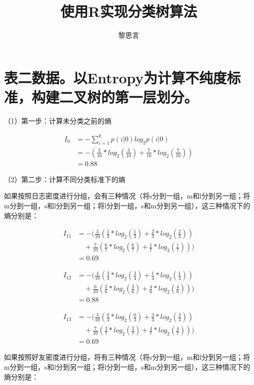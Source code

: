 \documentclass[11pt,a4paper,onecolumn]{article}
\begin{document}
\title{\bfseries 使用R实现分类树算法}
\date{}
\author{黎思言}
\maketitle

\section{表二数据。以Entropy为计算不纯度标准，构建二叉树的第一层划分。}

（1）第一步：计算未分类之前的熵

\begin{align*}
	I_0 &=-\sum_{i=1}^kp(i|0)log_2p(i|0) \\
      &=-(\frac{3}{10}*log_2(\frac{3}{10})+\frac{7}{10}*log_2(\frac{7}{10})) \\
			&=0.88
\end{align*}

（2）第二步：计算不同分类标准下的熵

如果按照日志密度进行分组，会有三种情况（将s分到一组，m和l分到另一组；将m分到一组，s和l分到另一组；将l分到一组，s和m分到另一组），这三种情况下的熵分别是：

\begin{align*}
	I_{11} &=-(\frac{3}{10}(\frac{1}{3}*log_2(\frac{1}{3})+\frac{2}{3}*log_2(\frac{2}{3})) \\
			&\quad+ \frac{7}{10}(\frac{6}{7}*log_2(\frac{6}{7})+\frac{1}{7}*log_2(\frac{1}{7}))) \\
			&=0.69
\end{align*}

\begin{align*}
	I_{12} &=-(\frac{4}{10}(\frac{3}{4}*log_2(\frac{3}{4})+\frac{1}{4}*log_2(\frac{1}{4}) )\\
			&\quad+ \frac{6}{10}(\frac{2}{6}*log_2(\frac{2}{6})+\frac{4}{6}*log_2(\frac{4}{6}))) \\
			&=0.88
\end{align*}

\begin{align*}
	I_{13} &=-(\frac{3}{10}(\frac{0}{3}*log_2(\frac{0}{3})+\frac{3}{3}*log_2(\frac{3}{3})) \\
			&\quad+ \frac{7}{10}(\frac{3}{7}*log_2(\frac{3}{7})+\frac{4}{7}*log_2(\frac{4}{7}))) \\
			&=0.69
\end{align*}

如果按照好友密度进行分组，将有三种情况（将s分到一组，m和l分到另一组；将m分到一组，s和l分到另一组；将l分到一组，s和m分到另一组），这三种情况下的熵分别是：
\end{document}
